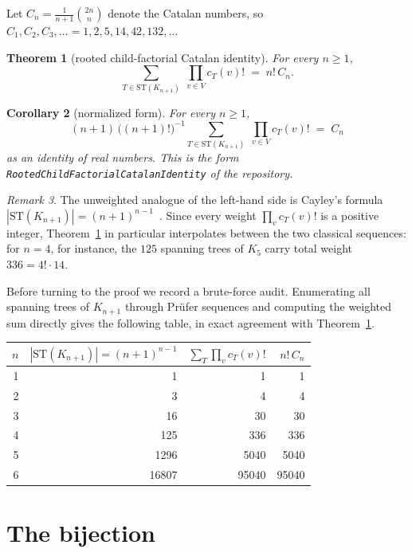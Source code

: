\documentclass[11pt]{article}
\newtheorem{theorem}{Theorem}[section]
\newtheorem{corollary}[theorem]{Corollary}
\theoremstyle{remark}
\newtheorem{remark}[theorem]{Remark}
\theoremstyle{definition}
\begin{document}
Let $C_n = \frac{1}{n+1}\binom{2n}{n}$ denote the Catalan numbers, so
$C_1, C_2, C_3, \dots = 1, 2, 5, 14, 42, 132, \dots$

\begin{theorem}[rooted child-factorial Catalan identity]\label{thm:main}
For every $n \ge 1$,
\[
  \sum_{T \in \mathrm{ST}(K_{n+1})} \; \prod_{v \in V} c_T(v)!
  \;=\; n! \, C_n .
\]
\end{theorem}

\begin{corollary}[normalized form]\label{cor:normalized}
For every $n \ge 1$,
\[
  (n+1)\,\bigl((n+1)!\bigr)^{-1}
  \sum_{T \in \mathrm{ST}(K_{n+1})} \; \prod_{v \in V} c_T(v)!
  \;=\; C_n
\]
as an identity of real numbers.  This is the form
\emph{\texttt{RootedChildFactorialCatalanIdentity}} of the repository.
\end{corollary}

\begin{remark}
The unweighted analogue of the left-hand side is Cayley's formula
$|\mathrm{ST}(K_{n+1})| = (n+1)^{n-1}$~\cite{Cayley1889}.  Since every weight
$\prod_v c_T(v)!$ is a positive integer, Theorem~\ref{thm:main} in particular
interpolates between the two classical sequences: for $n = 4$, for instance,
the $125$ spanning trees of $K_5$ carry total weight $336 = 4! \cdot 14$.
\end{remark}

Before turning to the proof we record a brute-force audit.  Enumerating all
spanning trees of $K_{n+1}$ through Pr\"ufer sequences and computing the
weighted sum directly gives the following table, in exact agreement with
Theorem~\ref{thm:main}.

\begin{center}
\begin{tabular}{rrrr}
\toprule
$n$ & $|\mathrm{ST}(K_{n+1})| = (n+1)^{n-1}$ &
$\sum_T \prod_v c_T(v)!$ & $n!\,C_n$ \\
\midrule
1 & 1 & 1 & 1 \\
2 & 3 & 4 & 4 \\
3 & 16 & 30 & 30 \\
4 & 125 & 336 & 336 \\
5 & 1296 & 5040 & 5040 \\
6 & 16807 & 95040 & 95040 \\
\bottomrule
\end{tabular}
\end{center}

\section{The bijection}\label{sec:bijection}
\end{document}
